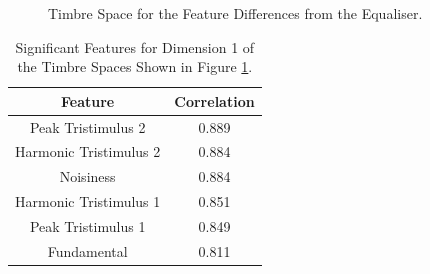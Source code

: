 		\begin{figure}[h!]
			\centering
			\qquad
			\caption{Timbre Space for the Feature Differences from the Equaliser.}
			\label{fig:EqualiserDifferenceMDSs}
		\end{figure}

		\begin{table}[h!]
			\centering
			\begin{tabular}{|c|c|}
				\hline
				\bf{Feature} & \bf{Correlation} \\
				\hline
				\hline
				Peak Tristimulus 2 & 0.889 \\
				\hline
				Harmonic Tristimulus 2 & 0.884 \\
				\hline
				Noisiness & 0.884 \\
				\hline
				Harmonic Tristimulus 1 & 0.851 \\
				\hline
				Peak Tristimulus 1 & 0.849 \\
				\hline
				Fundamental & 0.811 \\
				\hline
			\end{tabular}
			\caption{Significant Features for Dimension 1 of the Timbre Spaces Shown in Figure 
				 \ref{fig:EqualiserDifferenceMDSs}.}
			\label{tab:EqualiserDifferenceFeaturesDim1}
		\end{table}

